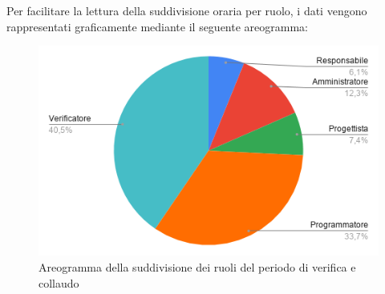 \documentclass[../piano-di-progetto.tex]{subfiles}
\begin{document}
  Per facilitare la lettura della suddivisione oraria per ruolo, i dati vengono rappresentati graficamente mediante il seguente areogramma:
  \begin{figure}[H]
    \centering
    \includegraphics[width=12cm]{img/ruoli-verifica.png}
    \caption{Areogramma della suddivisione dei ruoli del periodo di verifica e collaudo}
    \label{fig:ore-ruolo-verifica}
  \end{figure}
\end{document}
